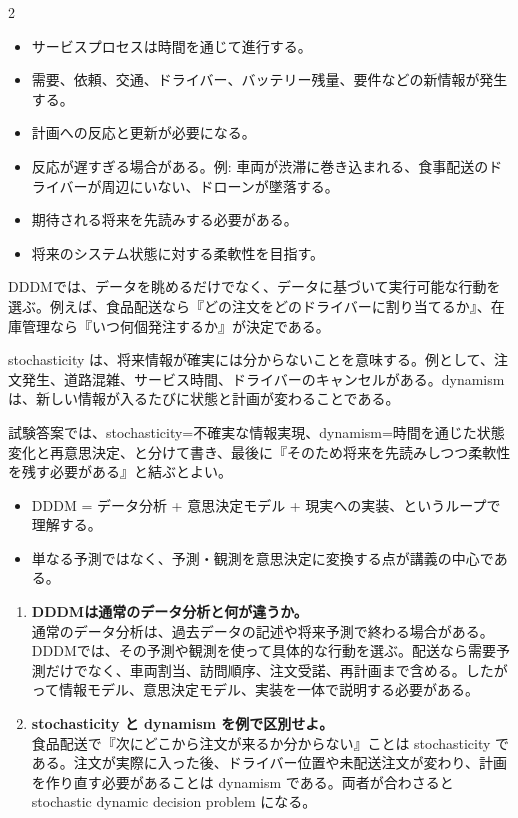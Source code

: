\clearpage
{}
\begin{multicols}{2}\footnotesize\raggedcolumns
{}
\begin{itemize}
\item サービスプロセスは時間を通じて進行する。
\item 需要、依頼、交通、ドライバー、バッテリー残量、要件などの新情報が発生する。
\item 計画への反応と更新が必要になる。
\item 反応が遅すぎる場合がある。例: 車両が渋滞に巻き込まれる、食事配送のドライバーが周辺にいない、ドローンが墜落する。
\item 期待される将来を先読みする必要がある。
\item 将来のシステム状態に対する柔軟性を目指す。
\end{itemize}
DDDMでは、データを眺めるだけでなく、データに基づいて実行可能な行動を選ぶ。例えば、食品配送なら『どの注文をどのドライバーに割り当てるか』、在庫管理なら『いつ何個発注するか』が決定である。\par

stochasticity は、将来情報が確実には分からないことを意味する。例として、注文発生、道路混雑、サービス時間、ドライバーのキャンセルがある。dynamism は、新しい情報が入るたびに状態と計画が変わることである。\par

試験答案では、stochasticity=不確実な情報実現、dynamism=時間を通じた状態変化と再意思決定、と分けて書き、最後に『そのため将来を先読みしつつ柔軟性を残す必要がある』と結ぶとよい。\par
{}
\begin{itemize}
\item DDDM = データ分析 + 意思決定モデル + 現実への実装、というループで理解する。
\item 単なる予測ではなく、予測・観測を意思決定に変換する点が講義の中心である。
\end{itemize}
\begin{enumerate}
\item \textbf{DDDMは通常のデータ分析と何が違うか。}\\通常のデータ分析は、過去データの記述や将来予測で終わる場合がある。DDDMでは、その予測や観測を使って具体的な行動を選ぶ。配送なら需要予測だけでなく、車両割当、訪問順序、注文受諾、再計画まで含める。したがって情報モデル、意思決定モデル、実装を一体で説明する必要がある。
\item \textbf{stochasticity と dynamism を例で区別せよ。}\\食品配送で『次にどこから注文が来るか分からない』ことは stochasticity である。注文が実際に入った後、ドライバー位置や未配送注文が変わり、計画を作り直す必要があることは dynamism である。両者が合わさると stochastic dynamic decision problem になる。
\end{enumerate}
\end{multicols}

